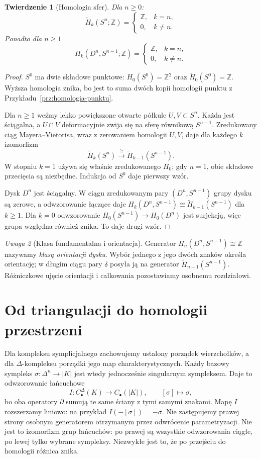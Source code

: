 \documentclass[11pt,a4paper,oneside]{report}
\newcommand{\Z}{\mathbb{Z}}
\theoremstyle{plain}
\newtheorem{twierdzenie}{Twierdzenie}[section]
\theoremstyle{definition}
\theoremstyle{remark}
\newtheorem{uwaga}[twierdzenie]{Uwaga}
\begin{document}
\begin{twierdzenie}[Homologia sfer]
\label{thm:homologia-sfer}
Dla $n\geq0$:
\[
 \widetilde H_k(S^n;\Z)=
 \begin{cases}\Z,&k=n,\\0,&k\ne n.\end{cases}
\]
Ponadto dla $n\geq1$
\[
 H_k(D^n,S^{n-1};\Z)=
 \begin{cases}\Z,&k=n,\\0,&k\ne n.\end{cases}
\]
\end{twierdzenie}
\begin{proof}
$S^0$ ma dwie składowe punktowe:
$H_0(S^0)=\Z^2$ oraz
$\widetilde H_0(S^0)=\Z$.
Wyższa homologia znika, bo jest
to suma dwóch kopii homologii
punktu z Przykładu~\ref{prz:homologia-punktu}.

Dla $n\geq1$ weźmy lekko
powiększone otwarte półkule
$U,V\subset S^n$. Każda jest
ściągalna, a $U\cap V$
deformacyjnie zwija się na
sferę równikową $S^{n-1}$.
Zredukowany ciąg
Mayera--Vietorisa, wraz z
zerowaniem homologii $U,V$,
daje dla każdego $k$ izomorfizm
\[
 \widetilde H_k(S^n)
 \xrightarrow{\ \cong\ }
 \widetilde H_{k-1}(S^{n-1}).
\]
W stopniu $k=1$ używa się
właśnie zredukowanego $H_0$;
gdy $n=1$, obie składowe
przecięcia są niezbędne.
Indukcja od $S^0$ daje pierwszy wzór.

Dysk $D^n$ jest ściągalny. W ciągu
zredukowanym pary $(D^n,S^{n-1})$
grupy dysku są zerowe, a odwzorowanie
łączące daje
$H_k(D^n,S^{n-1})\cong
\widetilde H_{k-1}(S^{n-1})$
dla $k\geq1$. Dla $k=0$
odwzorowanie $H_0(S^{n-1})\to H_0(D^n)$
jest surjekcją, więc grupa
względna również znika.
To daje drugi wzór.
\end{proof}

\begin{uwaga}[Klasa fundamentalna i orientacja]
Generator $H_n(D^n,S^{n-1})\cong\Z$
nazywamy \emph{klasą orientacji dysku}.
Wybór jednego z jego dwóch znaków
określa orientację; w długim ciągu
pary $\delta$ posyła ją na
generator $\widetilde H_{n-1}(S^{n-1})$.
Różniczkowe ujęcie orientacji
i całkowania pozostawiamy
osobnemu rozdziałowi.
\end{uwaga}

\section{Od triangulacji do homologii przestrzeni}
\label{sec:porownanie-symplicjalne}

Dla kompleksu symplicjalnego zachowujemy ustalony porządek
wierzchołków, a dla $\Delta$-kompleksu porządki jego map charakterystycznych.
Każdy bazowy sympleks $\sigma:\Delta^n\to|K|$ jest wtedy
jednocześnie singularnym sympleksem. Daje to odwzorowanie łańcuchowe
\[
 I:C_\bullet^\Delta(K)\longrightarrow C_\bullet(|K|),
 \qquad [\sigma]\longmapsto \sigma,
\]
bo oba operatory $\partial$ sumują te same
ściany z tymi samymi znakami.
Mapę $I$ rozszerzamy liniowo: na przykład $I(-[\sigma])=-\sigma$.
Nie zastępujemy prawej strony osobnym generatorem otrzymanym
przez odwrócenie parametryzacji. Nie jest to
izomorfizm grup łańcuchów: po prawej są
wszystkie odwzorowania ciągłe, po lewej tylko
wybrane sympleksy. Niezwykłe jest to,
że po przejściu do homologii różnica znika.
\end{document}
